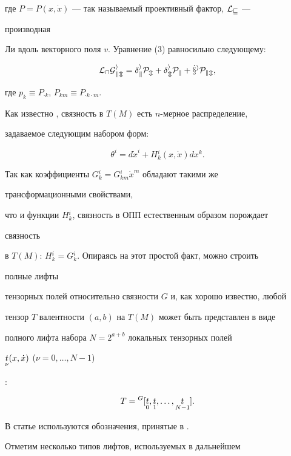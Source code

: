 где $P=P(x,\Dot x)$ --- так называемый проективный фактор, $\cal L_v$ --- 


производная 


Ли вдоль векторного поля $v$. Уравнение (3) равносильно следующему: 


$$ 


\cal L_uG{}^i_{km}=\delta{}^i_kP_m+\delta{}^i_mP_k 


+\Dot x^iP_{km}, 


$$ 


где $p_k\equiv P_{\cdot k}$, $P_{km}\equiv P_{\cdot k\cdot m}$. 


 


Как известно \cite{Nom}, связность в $T(M)$ есть $n$-мерное распределение, 


задаваемое следующим набором форм: 


$$ 


\theta^i=d\Dot x^i+H{}^i_k(x,\Dot x)dx^k. 


$$ 


Так как коэффициенты $G{}^i_k=G{}^i_{km}\Dot x^m$ обладают такими же 


трансформационными свойствами, 


что и функции $H{}^i_k$, связность в ОПП естественным образом порождает 


связность 


в $T(M)$: $H{}^i_k=G{}^i_k$. Опираясь на этот простой факт, можно строить 


полные лифты 


тензорных полей относительно связности $G$ и, как хорошо известно, любой 


тензор $T$ валентности $(a,b)$ на $T(M)$ может быть представлен в виде 


полного лифта набора $N=2^{a+b}$ локальных тензорных полей 


$\underset{\nu}{t}(x,\Dot x)$ ($\nu=0,\dotsc,N-1$) 


\cite{Kag1}: 


$$ 


T={}^G[\down{0}{t},\down{1}{t},\dotsc,\down{N-1}{t}]. 


$$ 


В статье используются обозначения, принятые в \cite{Kag1}. 


 


Отметим несколько типов лифтов, используемых в дальнейшем 


